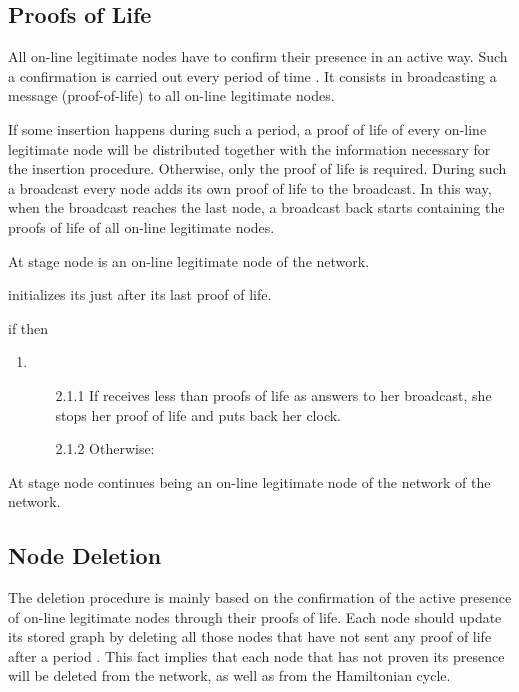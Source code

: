 \documentclass[conference]{IEEEtran}
\begin{document}
\subsection{Proofs of Life}

All on-line legitimate nodes have to confirm their presence in an active way. Such a confirmation is carried out every period of time . It consists in broadcasting a message (proof-of-life) to all on-line legitimate nodes.

If some insertion happens during such a period, a proof of life of every on-line legitimate node will be distributed together with the information necessary for the insertion procedure. Otherwise, only the proof of life is required. During such a broadcast every node adds its own proof of life to the broadcast. In this way, when the broadcast reaches the last node, a broadcast back starts containing the proofs of life of all on-line legitimate nodes.

\begin{description} 


\item [Input:] At stage  node  is an on-line legitimate node of the
network.
\item [1.]  initializes its  just after its last proof of
    life.
    \item [2.] if  then
    \begin{enumerate}
        [2.1]\item    
     \begin {itemize}
     \item [2.1.1] If  receives less than  proofs of life as answers to her broadcast, she stops her proof of life and puts back her clock.
      \item [2.1.2] Otherwise:    
\end {itemize}
    \end{enumerate}


    \item [Output:]  At stage  node  continues being an on-line
legitimate node of the network of the network.
\end{description}


\subsection{Node Deletion}


The deletion procedure is mainly based on the confirmation of the
active presence of on-line legitimate nodes through their proofs
of life. Each node should update its stored graph by deleting all
those nodes that have not sent any proof of life after a period
. This fact implies that each node that has not proven its presence
will be deleted from the network, as well as from the Hamiltonian cycle.
\end{document}
